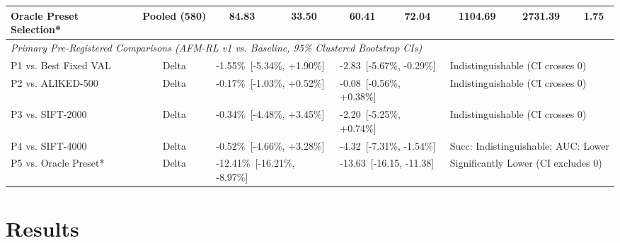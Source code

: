 \documentclass[conference]{IEEEtran}
\begin{document}
\begin{table}[t]
\begin{tabular}{lcccccccc}
Oracle Preset Selection* & Pooled (580) & 84.83 & 33.50 & 60.41 & 72.04 & 1104.69 & 2731.39 & 1.75 \\
\hline
\multicolumn{9}{l}{\textit{Primary Pre-Registered Comparisons (AFM-RL v1 vs. Baseline, 95\% Clustered Bootstrap CIs)}} \\
P1 vs. Best Fixed VAL & Delta & \multicolumn{2}{l}{-1.55\%\ [-5.34\%, +1.90\%]} & \multicolumn{2}{l}{-2.83\ [-5.67\%, -0.29\%]} & \multicolumn{3}{l}{Indistinguishable (CI crosses 0)} \\
P2 vs. ALIKED-500 & Delta & \multicolumn{2}{l}{-0.17\%\ [-1.03\%, +0.52\%]} & \multicolumn{2}{l}{-0.08\ [-0.56\%, +0.38\%]} & \multicolumn{3}{l}{Indistinguishable (CI crosses 0)} \\
P3 vs. SIFT-2000 & Delta & \multicolumn{2}{l}{-0.34\%\ [-4.48\%, +3.45\%]} & \multicolumn{2}{l}{-2.20\ [-5.25\%, +0.74\%]} & \multicolumn{3}{l}{Indistinguishable (CI crosses 0)} \\
P4 vs. SIFT-4000 & Delta & \multicolumn{2}{l}{-0.52\%\ [-4.66\%, +3.28\%]} & \multicolumn{2}{l}{-4.32\ [-7.31\%, -1.54\%]} & \multicolumn{3}{l}{Succ: Indistinguishable; AUC: Lower} \\
P5 vs. Oracle Preset* & Delta & \multicolumn{2}{l}{-12.41\%\ [-16.21\%, -8.97\%]} & \multicolumn{2}{l}{-13.63\ [-16.15, -11.38]} & \multicolumn{3}{l}{Significantly Lower (CI excludes 0)} \\
\hline
\end{tabular}
\end{table}

\section{Results}
\label{sec:results}
\end{document}
